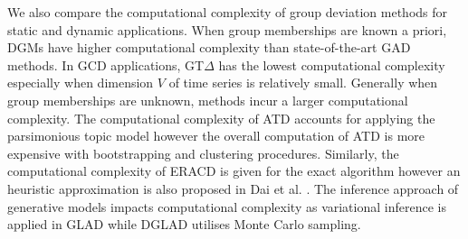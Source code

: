 We also compare the computational complexity of group deviation methods for static and dynamic applications. %
When group memberships are known a priori, DGMs have higher computational complexity than state-of-the-art GAD methods. 
In GCD applications, GT$\Delta$ has the lowest computational complexity especially when dimension $V$ of time series is relatively small.   
 Generally when group memberships are unknown, methods incur a larger computational complexity. The computational complexity of ATD accounts for applying the parsimonious topic model \cite{PTM} however the overall computation of ATD is more expensive with bootstrapping and clustering procedures.  Similarly, the computational complexity of ERACD is given for the exact algorithm however an heuristic approximation is also proposed in Dai et al. \cite{ERACD}. The inference approach of generative models  impacts computational complexity as variational inference is applied in GLAD  while DGLAD utilises Monte Carlo sampling. 
 
